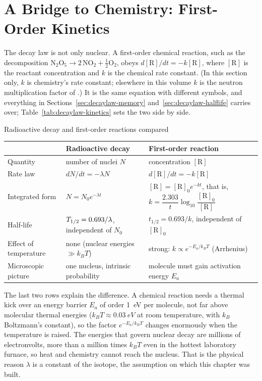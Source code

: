 \section{A Bridge to Chemistry: First-Order Kinetics}\label{sec:decaylaw-kinetics}

The decay law is not only nuclear. A first-order chemical reaction, such as the decomposition
$\mathrm{N_2O_5}\to2\,\mathrm{NO_2}+\tfrac12\mathrm{O_2}$, obeys $d[\mathrm{R}]/dt=-k[\mathrm{R}]$, where
$[\mathrm R]$ is the reactant concentration and $k$ is the chemical rate constant. (In this section
only, $k$ is chemistry's rate constant; elsewhere in this volume $k$ is the neutron multiplication factor
of .) It is the same equation with different symbols, and everything in
Sections~\ref{sec:decaylaw-memory} and~\ref{sec:decaylaw-halflife} carries over;
Table~\ref{tab:decaylaw-kinetics} sets the two side by side.

\begin{tablebox}{Radioactive decay and first-order reactions compared}
\centering
\begin{tabular}{@{}lll@{}}\toprule
 & \textbf{Radioactive decay} & \textbf{First-order reaction}\\\midrule
Quantity & number of nuclei $N$ & concentration $[\mathrm R]$\\
Rate law & $dN/dt=-\lambda N$ & $d[\mathrm R]/dt=-k[\mathrm R]$\\
Integrated form & $N=N_0e^{-\lambda t}$ & $[\mathrm R]=[\mathrm R]_0e^{-kt}$, that is,
$k=\dfrac{2.303}{t}\log_{10}\dfrac{[\mathrm R]_0}{[\mathrm R]}$\\[6pt]
Half-life & $T_{1/2}=0.693/\lambda$, independent of $N_0$ & $t_{1/2}=0.693/k$, independent of $[\mathrm R]_0$\\
Effect of temperature & none (nuclear energies $\gg k_BT$) & strong: $k\propto e^{-E_a/k_BT}$ (Arrhenius)\\
Microscopic picture & one nucleus, intrinsic probability & molecule must gain activation energy $E_a$\\\bottomrule
\end{tabular}\label{tab:decaylaw-kinetics}
\end{tablebox}

The last two rows explain the difference. A chemical reaction needs a thermal kick over an energy
barrier $E_a$ of order \SI{1}{eV} per molecule, not far above molecular thermal energies
($k_BT\approx\SI{0.03}{eV}$ at room temperature, with $k_B$ Boltzmann's constant), so the factor
$e^{-E_a/k_BT}$ changes enormously when the temperature is raised. The energies that govern nuclear
decay are millions of electronvolts, more than a million times $k_BT$ even in the hottest laboratory
furnace, so heat and chemistry cannot reach the nucleus. That is the physical reason $\lambda$ is a
constant of the isotope, the assumption on which this chapter was built.

